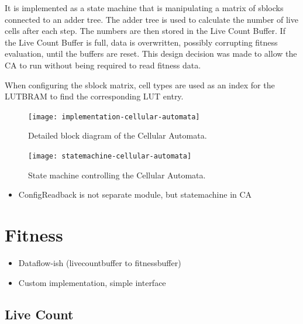 It is implemented as a state machine that is manipulating a matrix of sblocks connected to an adder tree.
The adder tree is used to calculate the number of live cells after each step.
The numbers are then stored in the Live Count Buffer.
If the Live Count Buffer is full, data is overwritten, possibly corrupting fitness evaluation, until the buffers are reset.
This design decision was made to allow the CA to run without being required to read fitness data.

When configuring the sblock matrix, cell types are used as an index for the LUTBRAM to find the corresponding LUT entry.

\begin{figure}[!ht]
    \centering
    \texttt{[image: implementation-cellular-automata]}
    \caption[Cellular Automata]{
        Detailed block diagram of the Cellular Automata.
    }
    \label{fig:implementation-cellular-automata}
\end{figure}

\begin{figure}[!ht]
    \centering
    \texttt{[image: statemachine-cellular-automata]}
    \caption[Cellular Automata state machine]{
        State machine controlling the Cellular Automata.
    }
    \label{fig:statemachine-cellular-automata}
\end{figure}

\begin{itemize}
    \item ConfigReadback is not separate module, but statemachine in CA
\end{itemize}


\section{Fitness}
\label{sec:fitness}

\begin{itemize}
    \item Dataflow-ish (livecountbuffer to fitnessbuffer)
    \item Custom implementation, simple interface
\end{itemize}

\subsection{Live Count}


